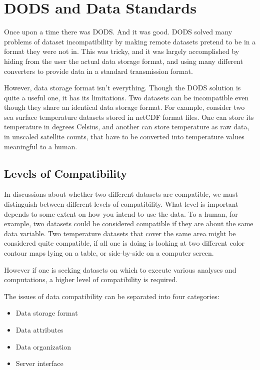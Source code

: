 %
%
%
%
%

\chapter{DODS and Data Standards}
\label{intro}

Once upon a time there was DODS.  And it was good.  DODS solved many
problems of dataset incompatibility by making remote datasets pretend
to be in a format they were not in.  This was tricky, and it was
largely accomplished by hiding from the user the actual data storage
format, and using many different converters to provide data in a
standard transmission format.

However, data storage format isn't everything.  Though the DODS
solution is quite a useful one, it has its limitations.  Two datasets
can be incompatible even though they share an identical data storage
format.  For example, consider two sea surface temperature datasets
stored in netCDF format files.  One can store its temperature in
degrees Celsius, and another can store temperature as raw data, in
unscaled satellite counts, that have to be converted into temperature
values meaningful to a human.


\section{Levels of Compatibility}
\label{sec:compat}

In discussions about whether two different datasets are compatible, we
must distinguish between different levels of compatibility.  What
level is important depends to some extent on how you intend to use the
data.  To a human, for example, two datasets could be considered
compatible if they are about the same data variable.  Two temperature
datasets that cover the same area might be considered quite compatible,
if all one is doing is looking at two different color contour maps
lying on a table, or side-by-side on a computer screen.

However if one is seeking datasets on which to execute various
analyses and computations, a higher level of compatibility is
required.

The issues of data compatibility can be separated into four
categories:

\begin{itemize}
\item Data storage format

\item Data attributes 

\item Data organization

\item Server interface

\end{itemize}


